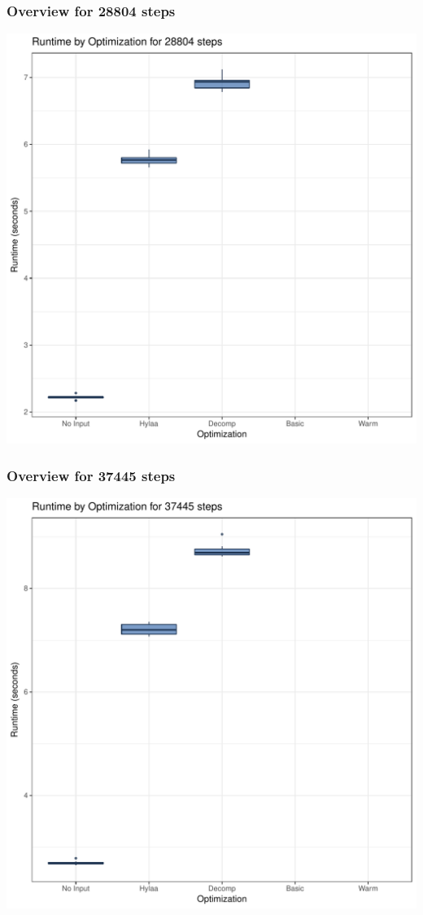 \documentclass{article}\usepackage[]{graphicx}\usepackage[]{color}
\makeatletter
\def\maxwidth{ %
  \ifdim\Gin@nat@width>\linewidth
    \linewidth
  \else
    \Gin@nat@width
  \fi
}
\newenvironment{knitrout}{}{} %
\makeatother
\begin{document}
\subsubsection{Overview for 28804 steps}
\begin{knitrout}
\color{fgcolor}
\includegraphics[width=\maxwidth]{figure/steps28804-1} 

\end{knitrout}
\subsubsection{Overview for 37445 steps}
\begin{knitrout}
\color{fgcolor}
\includegraphics[width=\maxwidth]{figure/steps37445-1} 

\end{knitrout}
\end{document}
